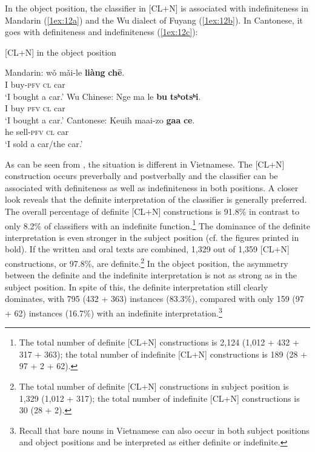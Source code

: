 \documentclass[output=paper]{langsci/langscibook}
\begin{document}
In the object position, the classifier in [CL+N] is associated with indefiniteness in Mandarin (\ref{1ex:12a}) and the Wu dialect of Fuyang (\ref{1ex:12b}). In Cantonese, it goes with definiteness and indefiniteness (\ref{1ex:12c}):

\begin{exe}
\ex\label{1ex:12}
[CL+N] in the object position \citep[][338-339]{li:bisang:12}
\begin{xlista}
	\ex\label{1ex:12a}
	Mandarin:
	\exi{}
	\gll wǒ  mǎi-le       {\textbf{liàng}}  {\textbf{chē}}. \\
	     I      buy-{\textsc{pfv}}  {\textsc{cl}}     car \\
	\glt `I bought a car.'
	\ex\label{1ex:12b}
	Wu Chinese:
	\exi{}
	\gll Nge   ma   le      {\textbf{bu}}    {\textbf{tsʰotsʰi}}. \\
	     I        buy  {\textsc{pfv}}  {\textsc{cl}}   car \\
	\glt `I bought a car.'
	\ex\label{1ex:12c}
	Cantonese:
	\exi{}
	\gll Keuih   maai-zo    {\textbf{gaa}}  {\textbf{ce}}. \\
	     he         sell-{\textsc{pfv}}   {\textsc{cl}}   car \\
	\glt `I sold a car/the car.'
	\end{xlista}
\end{exe}

\largerpage
As can be seen from , the situation is different in Vietnamese. The [CL+N] construction occurs preverbally and postverbally and the classifier can be associated with definiteness as well as indefiniteness in both positions. A closer look reveals that the definite interpretation of the classifier is generally preferred. The overall percentage of definite [CL+N] constructions is 91.8\% in contrast to only 8.2\% of classifiers with an indefinite function.\footnote{The total number of definite [CL+N] constructions is 2,124 (1,012 + 432 + 317 + 363); the total number of indefinite [CL+N] constructions is 189 (28 + 97 + 2 + 62).} The dominance of the definite interpretation is even stronger in the subject position (cf. the figures printed in bold). If the written and oral texts are combined, 1,329 out of 1,359 [CL+N] constructions, or 97.8\%, are definite.\footnote{The total number of definite [CL+N] constructions in subject position is 1,329 (1,012 + 317); the total number of indefinite [CL+N] constructions is 30 (28 + 2).} In the object position, the asymmetry between the definite and the indefinite interpretation is not as strong as in the subject position. In spite of this, the definite interpretation still clearly dominates, with 795 (432 + 363) instances
(83.3\%), compared with only 159 (97 + 62) instances (16.7\%) with an indefinite interpretation.\footnote{Recall that bare nouns in Vietnamese can also occur in both subject positions and object positions and be interpreted as either definite or indefinite.}
\end{document}
